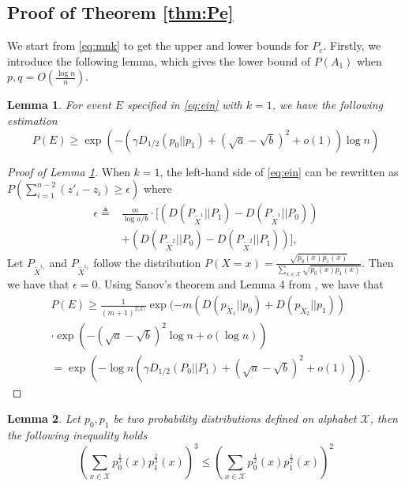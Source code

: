 \documentclass[conference,letterpaper]{IEEEtran}
\newtheorem{lemma}{Lemma}
\begin{document}
\subsection{Proof of Theorem \ref{thm:Pe}}
We start from \eqref{eq:mnk} to get the upper and lower bounds for $P_e$.
Firstly, we introduce the following lemma, which gives the lower bound
of $P(A_1)$ when $p,q=O(\frac{\log n}{n})$.
\begin{lemma}\label{lem:single_lower}
For event $E$ specified in \eqref{eq:ein} with $k=1$,
we have the following estimation
\begin{equation}
P(E) \geq \exp(-(\gamma D_{1/2}(p_0||p_1) + (\sqrt{a}-\sqrt{b})^2 + o(1))\log n )
\end{equation}
\end{lemma}
\begin{proof}[Proof of Lemma \ref{lem:single_lower}] 
	When $k=1$, the left-hand side of \eqref{eq:ein} can be rewritten as $P(\sum_{i=1}^{n-2} (z'_i - z_i) \geq \epsilon)$
	where
	\begin{align*}
	\epsilon\triangleq&\frac{m}{\log a/b}\cdot [(D(P_{\widetilde{X}^{1}} || P_1) - D(P_{\widetilde{X}^{1}} || P_0)) \\
	&+(D(P_{\widetilde{X}^{2}} || P_0) - D(P_{\widetilde{X}^{2}} || P_1))],
	\end{align*}
	Let $P_{\widetilde{X}^{i_1}}$ and $P_{\widetilde{X}^{i_2}}$ follow the distribution
	$P(X=x)=\frac{\sqrt{p_0(x)p_1(x)}}{ \sum_{x\in \mathcal{X}} \sqrt{p_0(x) p_1(x)}} $.
	Then we have that $\epsilon =0$. Using Sanov's theorem and Lemma 4 from \cite{abbe2015exact}, we have that
	\begin{align*}
	 &P(E)
	\geq\frac{1}{(m+1)^{2|\mathcal{X}|}} \exp(-m(D(p_{\widetilde{X}_1} || p_0) + D(p_{\widetilde{X}_2} || p_1)) \\
	&\cdot\exp(- (\sqrt{a} - \sqrt{b})^2\log n+o(\log n) ) \\
	& = \exp(-\log n (\gamma D_{1/2}(P_0||P_1) + (\sqrt{a} - \sqrt{b})^2+ o(1))).
	\end{align*}
\end{proof}
\begin{lemma}\label{lem:p0p1}
	Let $p_0,p_1$ be two probability distributions defined on alphabet $\mathcal{X}$,
	then the following inequality holds
	\begin{equation}\label{eq:32}
		(\sum_{x\in \mathcal{X}} p^{\frac{1}{3}}_0(x) p^{\frac{2}{3}}_1(x))^3
		\leq (\sum_{x\in \mathcal{X}} p^{\frac{1}{2}}_0(x) p^{\frac{1}{2}}_1(x))^2
	\end{equation}
\end{lemma}
\end{document}
